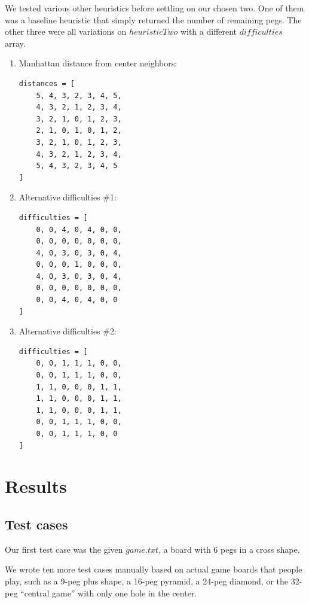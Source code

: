 \documentclass[11pt]{article}
\begin{document}
We tested various other heuristics before settling on our chosen two. One of
them was a baseline heuristic that simply returned the number of remaining
pegs. The other three were all variations on \(heuristicTwo\) with a different
\(difficulties\) array.

\begin{enumerate}

\item Manhattan distance from center neighbors:

\begin{lstlisting}[frame=single]
distances = [
	5, 4, 3, 2, 3, 4, 5,
	4, 3, 2, 1, 2, 3, 4,
	3, 2, 1, 0, 1, 2, 3,
	2, 1, 0, 1, 0, 1, 2,
	3, 2, 1, 0, 1, 2, 3,
	4, 3, 2, 1, 2, 3, 4,
	5, 4, 3, 2, 3, 4, 5
]
\end{lstlisting}

\item Alternative difficulties \#1:

\lstset{language=Python}
\begin{lstlisting}[frame=single]
difficulties = [
	0, 0, 4, 0, 4, 0, 0,
	0, 0, 0, 0, 0, 0, 0,
	4, 0, 3, 0, 3, 0, 4,
	0, 0, 0, 1, 0, 0, 0,
	4, 0, 3, 0, 3, 0, 4,
	0, 0, 0, 0, 0, 0, 0,
	0, 0, 4, 0, 4, 0, 0
]
\end{lstlisting}

\item Alternative difficulties \#2:

\lstset{language=Python}
\begin{lstlisting}[frame=single]
difficulties = [
	0, 0, 1, 1, 1, 0, 0,
	0, 0, 1, 1, 1, 0, 0,
	1, 1, 0, 0, 0, 1, 1,
	1, 1, 0, 0, 0, 1, 1,
	1, 1, 0, 0, 0, 1, 1,
	0, 0, 1, 1, 1, 0, 0,
	0, 0, 1, 1, 1, 0, 0
]
\end{lstlisting}

\end{enumerate}

\section{Results}

\subsection{Test cases}

Our first test case was the given \(game.txt\), a board with 6 pegs in a
cross shape.

We wrote ten more test cases manually based on actual game boards that people
play, such as a 9-peg plus shape, a 16-peg pyramid, a 24-peg diamond, or the
32-peg ``central game'' with only one hole in the center.
\end{document}
